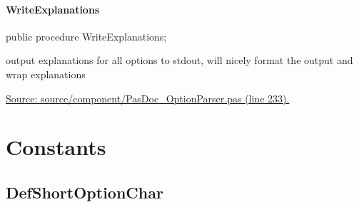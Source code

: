 \documentclass{report}
\newif\ifpdf
\begin{document}
\paragraph*{WriteExplanations}\hspace*{\fill}

\label{PasDoc_OptionParser.TOptionParser-WriteExplanations}
\begin{list}{}{
\setlength{\itemindent}{0cm}
\setlength{\listparindent}{0cm}
\setlength{\leftmargin}{\evensidemargin}
\addtolength{\leftmargin}{\tmplength}
\settowidth{\labelsep}{X}
\addtolength{\leftmargin}{\labelsep}
\setlength{\labelwidth}{\tmplength}
}
\item[\textbf{Declaration}\hfill]
\ifpdf
\begin{flushleft}
\fi
\begin{ttfamily}
public procedure WriteExplanations;\end{ttfamily}

\ifpdf
\end{flushleft}
\fi

\par
\item[\textbf{Description}]
output explanations for all options to stdout, will nicely format the output and wrap explanations\par
\href{https://github.com/pasdoc/pasdoc/blob/master/source/component/PasDoc_OptionParser.pas#L233}{Source: source/component/PasDoc{\_}OptionParser.pas (line 233).}

\end{list}
\section{Constants}
\ifpdf
\subsection*{\large{\textbf{DefShortOptionChar}}\normalsize\hspace{1ex}\hrulefill}
\else
\end{document}
